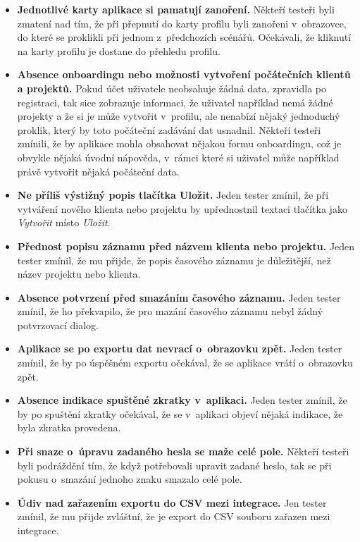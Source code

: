 \begin{itemize}
\item\textbf{Jednotlivé karty aplikace si pamatují zanoření.} Někteří testeři byli zmatení nad tím, že při přepnutí do karty profilu byli zanořeni v~obrazovce, do které se proklikli při jednom z~předchozích scénářů. Očekávali, že kliknutí na karty profilu je dostane do přehledu profilu.
\item\textbf{Absence onboardingu nebo možnosti vytvoření počátečních klientů a projektů.} Pokud účet uživatele neobsahuje žádná data, zpravidla po registraci, tak sice zobrazuje informaci, že uživatel například nemá žádné projekty a že si je může vytvořit v~profilu, ale nenabízí nějaký jednoduchý proklik, který by toto počáteční zadávání dat usnadnil. Někteří testeři zmínili, že by aplikace mohla obsahovat nějakou formu onboardingu, což je obvykle nějaká úvodní nápověda, v~rámci které si uživatel může například právě vytvořit nějaká počáteční data.
\item\textbf{Ne příliš výstižný popis tlačítka Uložit.} Jeden tester zmínil, že při vytváření nového klienta nebo projektu by upřednostnil textaci tlačítka jako \emph{Vytvořit} místo \emph{Uložit}.
\item\textbf{Přednost popisu záznamu před názvem klienta nebo projektu.} Jeden tester zmínil, že mu přijde, že popis časového záznamu je důležitější, než název projektu nebo klienta.
\item\textbf{Absence potvrzení před smazáním časového záznamu.} Jeden tester zmínil, že ho překvapilo, že pro mazání časového záznamu nebyl žádný potvrzovací dialog.
\item\textbf{Aplikace se po exportu dat nevrací o~obrazovku zpět.} Jeden tester zmínil, že by po úspěšném exportu očekával, že se aplikace vrátí o~obrazovku zpět.
\item\textbf{Absence indikace spuštěné zkratky v~aplikaci.} Jeden tester zmínil, že by po spuštění zkratky očekával, že se v~aplikaci objeví nějaká indikace, že byla zkratka provedena.
\item\textbf{Při snaze o~úpravu zadaného hesla se maže celé pole.} Někteří testeři byli podráždění tím, že když potřebovali upravit zadané heslo, tak se při pokusu o~smazání jednoho znaku smazalo celé pole.
\item\textbf{Údiv nad zařazením exportu do CSV mezi integrace.} Jen tester zmínil, že mu přijde zvláštní, že je export do CSV souboru zařazen mezi integrace.
\end{itemize}

